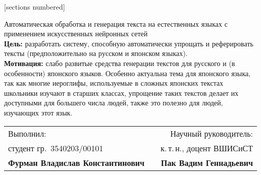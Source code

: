 \begin{frame}[plain]{}
  [sections numbered]
  \begin{center}%
    \Large
    {Автоматическая обработка и генерация текста на естественных языках с применением искусственных нейронных сетей} \\[6pt]
    \scriptsize
    \textbf{Цель:} разработать систему, способную автоматически упрощать и реферировать тексты (предположительно на русском и японском языках). \\
    \textbf{Мотивация:} слабо развитые средства генерации текстов для русского и (в особенности) японского языков.
    Особенно актуальна тема для японского языка, так как многие иероглифы, используемые в сложных японских текстах школьники изучают в старших классах, упрощение таких текстов делает их доступными для большего числа людей, также это полезно для людей, изучающих этот язык.
  \end{center}
  \vfill
  \footnotesize
  \begin{tabularx}{\textwidth}{LcR}%
    Выполнил: &  &  Научный руководитель: \\ 
    студент гр.~3540203/00101 &  &  к.\,т.\,н., доцент ВШИСиСТ \\
    \textbf{Фурман Владислав Константинович} &  & \textbf{Пак Вадим Геннадьевич}
  \end{tabularx}%

\end{frame}
